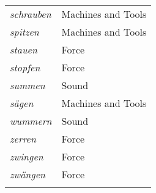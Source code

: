 \documentclass[output=paper]{langsci/langscibook}
\begin{document}
\begin{table}[H]
\begin{tabular}{>{\itshape}ll}
    schrauben & Machines and Tools \\
    spitzen & Machines and Tools \\
    stauen & Force \\
    stopfen & Force \\
    summen & Sound \\
    sägen & Machines and Tools \\
    wummern & Sound \\
    zerren & Force \\
    zwingen & Force \\
    zwängen & Force \\
    \lspbottomrule
  \end{tabular}
\end{table}
\end{document}
